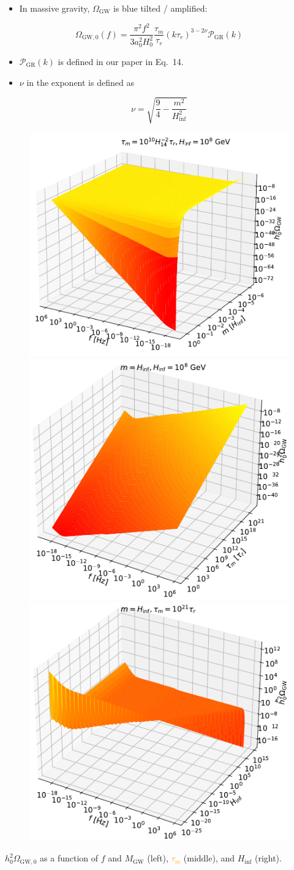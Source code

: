 \documentclass{beamer}                             %
\begin{document}
\begin{frame}[t]
\begin{columns}[T]
\begin{column}{0.30\textwidth}
\begin{tcolorbox}
    \begin{itemize}
        \item In massive gravity, $\Omega_{\text{GW}}$ is blue tilted / amplified:
    \end{itemize}
    $$\Omega_{\text{GW},0}(f) = \frac{\pi^2f^2}{3a_0^2 H_0^2}\frac{\tau_m}{\tau_r}(k\tau_r)^{3-2\nu}\mathcal{P}_{\text{GR}}(k)$$
    \begin{itemize}
        \item $\mathcal{P}_{\text{GR}}(k)$ is defined in our paper \cite{Choi:2023tun} in Eq.\ 14.
        \item $\nu$ in the exponent is defined as 
    \end{itemize}
    $$\nu = \sqrt{\frac{9}{4} - \frac{m^2}{H_{\inf}^2}}$$
     \begin{figure}[t]
          \includegraphics[width=.32\linewidth]{fig4a.pdf} 
          \includegraphics[width=.32\linewidth]{fig4b.pdf} 
          \includegraphics[width=.32\linewidth]{fig4c.pdf} 
          \label{fig:contours}
        \end{figure}
     $h_0^2\Omega_{\text{GW},0}$ as a function of $f$ and \textcolor{darksilver}{$M_{\text{GW}}$} (left), \textcolor{orange}{$\tau_m$} (middle), and \textcolor{rust}{$H_{\text{inf}}$} (right). 
  \end{tcolorbox}
  

\end{column}
\end{columns}
\end{frame}
\end{document}
